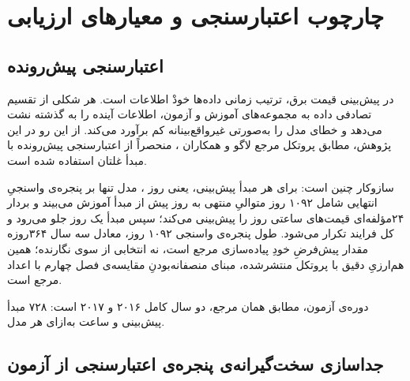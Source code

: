 
\section{چارچوب اعتبارسنجی و معیارهای ارزیابی}
\label{sec:3-5}

\subsection*{اعتبارسنجی پیش‌رونده}

در پیش‌بینی قیمت برق، ترتیب زمانی داده‌ها خودْ اطلاعات است. هر شکلی از تقسیم تصادفی
داده به مجموعه‌های آموزش و آزمون، اطلاعات آینده را به گذشته نشت می‌دهد و خطای مدل را
به‌صورتی غیرواقع‌بینانه کم برآورد می‌کند. از این رو در این پژوهش، مطابق پروتکل مرجع
لاگو و همکاران \cite{lago_forecasting_2021}، منحصراً از اعتبارسنجی پیش‌رونده با مبدأ
غلتان استفاده شده است.

سازوکار چنین است: برای هر مبدأ پیش‌بینی، یعنی روز ، مدل تنها بر پنجره‌ی واسنجیِ
انتهایی شامل ۱۰۹۲ روز متوالیِ منتهی به روز پیش از مبدأ آموزش می‌بیند و بردار
۲۴مؤلفه‌ای قیمت‌های ساعتی روز  را پیش‌بینی می‌کند؛ سپس مبدأ یک روز جلو می‌رود
و کل فرایند تکرار می‌شود. طول پنجره‌ی واسنجی  ۱۰۹۲ روز، معادل سه سال ۳۶۴روزه
 مقدار پیش‌فرضِ خودِ پیاده‌سازی مرجع است، نه انتخابی از سوی نگارنده؛ همین
هم‌ارزیِ دقیق با پروتکل منتشرشده، مبنای منصفانه‌بودنِ مقایسه‌ی فصل چهارم با اعداد مرجع
است.

دوره‌ی آزمون، مطابق همان مرجع، دو سال کامل ۲۰۱۶ و ۲۰۱۷ است: ۷۲۸ مبدأ پیش‌بینی و
 ساعت به‌ازای هر مدل.

\subsection*{جداسازی سخت‌گیرانه‌ی پنجره‌ی اعتبارسنجی از آزمون}

